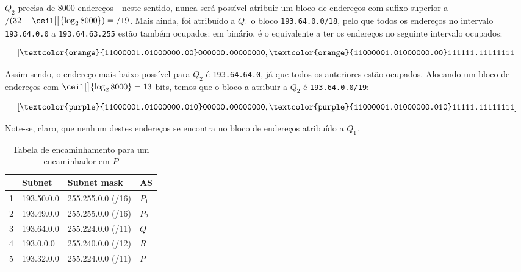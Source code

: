 \begin{enumerate}[leftmargin=\labelsep]

        $Q_2$ precisa de 8000 endereços - neste sentido, nunca será possível atribuir
        um bloco de endereços com sufixo superior a $/(32 - \ceil[\big]{\log_2{8000}}) = /19$.
        Mais ainda, foi atribuído a $Q_1$ o bloco \texttt{193.64.0.0/18}, pelo
        que todos os endereços no intervalo \texttt{193.64.0.0} a \texttt{193.64.63.255}
        estão também ocupados: em binário, é o equivalente a ter os endereços no
        seguinte intervalo ocupados:

        $$
          [\texttt{\textcolor{orange}{11000001.01000000.00}000000.00000000}, \texttt{\textcolor{orange}{11000001.01000000.00}111111.11111111}]
        $$

        Assim sendo, o endereço mais baixo possível para $Q_2$ é \texttt{193.64.64.0},
        já que todos os anteriores estão ocupados. Alocando um bloco de endereços com
        $\ceil[\big]{\log_2{8000}} = 13$ bits, temos que o bloco a atribuir a $Q_2$ é
        \texttt{193.64.0.0/19}:

        $$
          [\texttt{\textcolor{purple}{11000001.01000000.010}00000.00000000}, \texttt{\textcolor{purple}{11000001.01000000.010}11111.11111111}]
        $$

        Note-se, claro, que nenhum destes endereços se encontra no bloco de endereços
        atribuído a $Q_1$.


        \begin{table}[H]
          \centering
          \begin{tabular}{l|l|l|l}
              & Subnet     & Subnet mask       & AS    \\ \hline
            1 & 193.50.0.0 & 255.255.0.0 (/16) & $P_1$ \\
            2 & 193.49.0.0 & 255.255.0.0 (/16) & $P_2$ \\
            3 & 193.64.0.0 & 255.224.0.0 (/11) & $Q$   \\
            4 & 193.0.0.0  & 255.240.0.0 (/12) & $R$   \\
            5 & 193.32.0.0 & 255.224.0.0 (/11) & $P$
          \end{tabular}
          \caption{Tabela de encaminhamento para um encaminhador em $P$}
          \label{tab:p-ftable}
        \end{table}


\end{enumerate}
